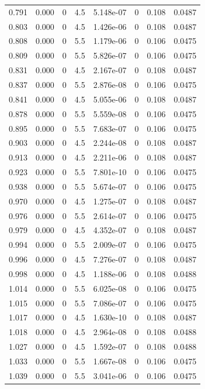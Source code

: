 \documentclass[preview]{standalone}
\begin{document}
{{{\begin{tabular}{L{1.2cm}C{1.2cm} C{0.3cm}C{0.5cm} C{1.4cm}C{1.4cm} C{1.4cm}C{1.4cm}}
  0.791  &  0.000  & 0     & 4.5 &  5.148e-07  & 0  & 0.108 &  0.0487   \\ 
  0.803  &  0.000  & 0     & 4.5 &  1.426e-06  & 0  & 0.108 &  0.0487   \\ 
  0.808  &  0.000  & 0     & 5.5 &  1.179e-06  & 0  & 0.106 &  0.0475   \\ 
  0.809  &  0.000  & 0     & 5.5 &  5.826e-07  & 0  & 0.106 &  0.0475   \\ 
  0.831  &  0.000  & 0     & 4.5 &  2.167e-07  & 0  & 0.108 &  0.0487   \\ 
  0.837  &  0.000  & 0     & 5.5 &  2.876e-08  & 0  & 0.106 &  0.0475   \\ 
  0.841  &  0.000  & 0     & 4.5 &  5.055e-06  & 0  & 0.108 &  0.0487   \\ 
  0.878  &  0.000  & 0     & 5.5 &  5.559e-08  & 0  & 0.106 &  0.0475   \\ 
  0.895  &  0.000  & 0     & 5.5 &  7.683e-07  & 0  & 0.106 &  0.0475   \\ 
  0.903  &  0.000  & 0     & 4.5 &  2.244e-08  & 0  & 0.108 &  0.0487   \\ 
  0.913  &  0.000  & 0     & 4.5 &  2.211e-06  & 0  & 0.108 &  0.0487   \\ 
  0.923  &  0.000  & 0     & 5.5 &  7.801e-10  & 0  & 0.106 &  0.0475   \\ 
  0.938  &  0.000  & 0     & 5.5 &  5.674e-07  & 0  & 0.106 &  0.0475   \\ 
  0.970  &  0.000  & 0     & 4.5 &  1.275e-07  & 0  & 0.108 &  0.0487   \\ 
  0.976  &  0.000  & 0     & 5.5 &  2.614e-07  & 0  & 0.106 &  0.0475   \\ 
  0.979  &  0.000  & 0     & 4.5 &  4.352e-07  & 0  & 0.108 &  0.0487   \\ 
  0.994  &  0.000  & 0     & 5.5 &  2.009e-07  & 0  & 0.106 &  0.0475   \\ 
  0.996  &  0.000  & 0     & 4.5 &  7.276e-07  & 0  & 0.108 &  0.0487   \\ 
  0.998  &  0.000  & 0     & 4.5 &  1.188e-06  & 0  & 0.108 &  0.0488   \\ 
  1.014  &  0.000  & 0     & 5.5 &  6.025e-08  & 0  & 0.106 &  0.0475   \\ 
  1.015  &  0.000  & 0     & 5.5 &  7.086e-07  & 0  & 0.106 &  0.0475   \\ 
  1.017  &  0.000  & 0     & 4.5 &  1.630e-10  & 0  & 0.108 &  0.0487   \\ 
  1.018  &  0.000  & 0     & 4.5 &  2.964e-08  & 0  & 0.108 &  0.0488   \\ 
  1.027  &  0.000  & 0     & 4.5 &  1.592e-07  & 0  & 0.108 &  0.0488   \\ 
  1.033  &  0.000  & 0     & 5.5 &  1.667e-08  & 0  & 0.106 &  0.0475   \\ 
  1.039  &  0.000  & 0     & 5.5 &  3.041e-06  & 0  & 0.106 &  0.0475   \\ 
\hline 
\end{tabular} 

}}}
\end{document}
